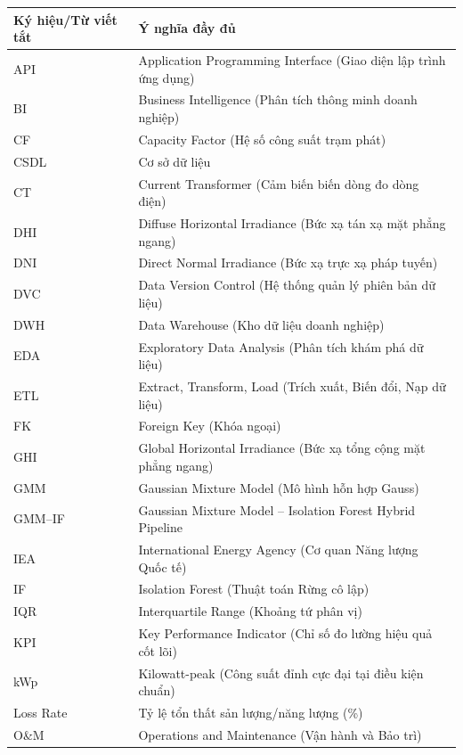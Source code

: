 \documentclass[12pt, a4paper]{report}
\begin{document}
\noindent\hspace*{-6pt}%
    \begin{tabularx}{\textwidth}{@{} l X @{}}
    \toprule
    \textbf{Ký hiệu/Từ viết tắt} & \textbf{Ý nghĩa đầy đủ} \\
    \midrule
    API       & Application Programming Interface (Giao diện lập trình ứng dụng) \\
    BI        & Business Intelligence (Phân tích thông minh doanh nghiệp) \\
    CF        & Capacity Factor (Hệ số công suất trạm phát) \\
    CSDL      & Cơ sở dữ liệu \\
    CT        & Current Transformer (Cảm biến biến dòng đo dòng điện) \\
    DHI       & Diffuse Horizontal Irradiance (Bức xạ tán xạ mặt phẳng ngang) \\
    DNI       & Direct Normal Irradiance (Bức xạ trực xạ pháp tuyến) \\
    DVC       & Data Version Control (Hệ thống quản lý phiên bản dữ liệu) \\
    DWH       & Data Warehouse (Kho dữ liệu doanh nghiệp) \\
    EDA       & Exploratory Data Analysis (Phân tích khám phá dữ liệu) \\
    ETL       & Extract, Transform, Load (Trích xuất, Biến đổi, Nạp dữ liệu) \\
    FK        & Foreign Key (Khóa ngoại) \\
    GHI       & Global Horizontal Irradiance (Bức xạ tổng cộng mặt phẳng ngang) \\
    GMM       & Gaussian Mixture Model (Mô hình hỗn hợp Gauss) \\
    GMM--IF   & Gaussian Mixture Model -- Isolation Forest Hybrid Pipeline \\
    IEA       & International Energy Agency (Cơ quan Năng lượng Quốc tế) \\
    IF        & Isolation Forest (Thuật toán Rừng cô lập) \\
    IQR       & Interquartile Range (Khoảng tứ phân vị) \\
    KPI       & Key Performance Indicator (Chỉ số đo lường hiệu quả cốt lõi) \\
    kWp       & Kilowatt-peak (Công suất đỉnh cực đại tại điều kiện chuẩn) \\
    Loss Rate & Tỷ lệ tổn thất sản lượng/năng lượng (\%) \\
    O\&M      & Operations and Maintenance (Vận hành và Bảo trì) \\

\end{tabularx}
\end{document}
